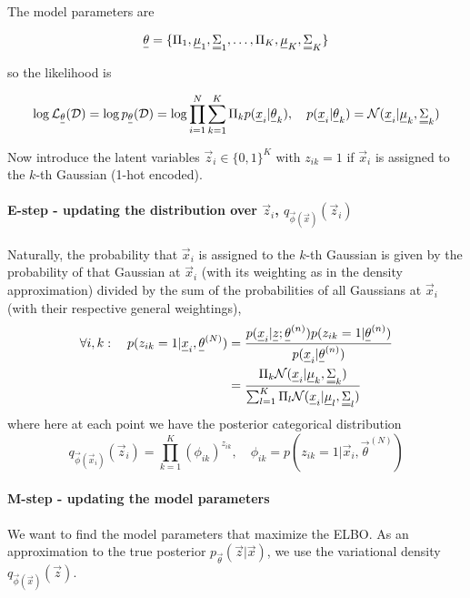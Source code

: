The model parameters are

\begin{equation}
    \vec{\theta} = \{ \Pi_1, \vec{\mu}_1, \mat{\Sigma}_1, \dots, \Pi_K, \vec{\mu}_K, \mat{\Sigma}_K \}
\end{equation}

so the likelihood is

\begin{equation}
    \log \mathcal{L}_{\vec{\theta}}(\mathcal{D}) = \log p_{\vec{\theta}}(\mathcal{D}) = \log \prod_{i=1}^{N} \sum_{k=1}^{K} \Pi_k p(\vec{x}_i | \vec{\theta}_k), \quad p(\vec{x}_i | \vec{\theta}_k) = \mathcal{N}(\vec{x}_i | \vec{\mu}_k, \mat{\Sigma}_k)
\end{equation}

Now introduce the latent variables $\vec{z}_i \in \{0,1\}^K$ with $z_{ik} = 1$ if $\vec{x}_i$ is assigned to the $k$-th Gaussian
(1-hot encoded).

\paragraph*{E-step - updating the distribution over $\vec{z}_i$, $q_{\vec{\phi}(\vec{x})}(\vec{z}_i)$} Naturally, the probability that $\vec{x}_i$ is assigned to the $k$-th Gaussian is given by
the probability of that Gaussian at $\vec{x}_i$ (with its weighting as in the density approximation) divided by the sum of the probabilities of all Gaussians at $\vec{x}_i$ (with their respective
general weightings),
\begin{equation}
    \begin{aligned}
        \forall i,k: \quad p(z_{ik} = 1 | \vec{x}_i, \vec{\theta}^{(N)}) &= \frac{p(\vec{x}_i|\vec{z};\vec{\theta}^{(n)}) p(z_{ik} = 1 | \vec{\theta}^{(n)})}{p(\vec{x}_i | \vec{\theta}^{(n)})} \\
        &= \frac{\Pi_k \mathcal{N}(\vec{x}_i | \vec{\mu}_k, \mat{\Sigma}_k)}{\sum_{l=1}^{K} \Pi_l \mathcal{N}(\vec{x}_i | \vec{\mu}_l, \mat{\Sigma}_l)}
    \end{aligned}
\end{equation}
where here at each point we have the posterior categorical distribution
\begin{equation}
    q_{\vec{\phi}(\vec{x}_i)}(\vec{z}_i) = \prod_{k=1}^{K} \left( \phi_{ik} \right)^{z_{ik}}, \quad \phi_{ik} = p\left(z_{ik} = 1 | \vec{x}_i, \vec{\theta}^{(N)}\right)
\end{equation}

\paragraph*{M-step - updating the model parameters} We want to find the model parameters that maximize the ELBO. As an approximation
to the true posterior $p_{\vec{\theta}}(\vec{z} | \vec{x})$, we use the variational density $q_{\vec{\phi}(\vec{x})}(\vec{z})$.

